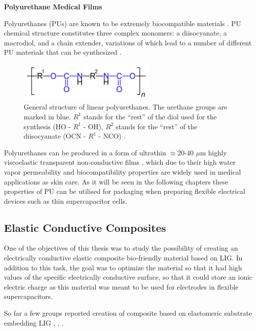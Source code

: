 \textbf{Polyurethane Medical Films}

Polyurethanes (PUs) are known to be extremely biocompatible materials \cite{SASTRI2014121}. PU chemical structure constitutes three complex monomers: a diisocyanate, a macrodiol, and a chain extender, variations of which lead to a number of different PU materials that can be synthesized \cite{KOHLI2019125}.

\begin{figure}[H]
\centering
\includegraphics[width=0.6\textwidth]{Figures/Theory/2880px-Polyurethane-allg.png}
\medskip
\captionsetup{width=0.6\linewidth}
\caption{General structure of linear polyurethanes. The urethane groups are marked in blue. $R^1$ stands for the “rest” of the diol used for the synthesis (HO - $R^1$ - OH), $R^2$ stands for the “rest” of the diisocyanate (OCN - $R^1$ - NCO) \cite{Polyurethanen}.}
\label{fig:PU-structure}
\end{figure}

Polyurethanes can be produced in a form of ultrathin $\approx$20-40 $\mu$m highly viscoelastic transparent non-conductive films \cite{Fixomull}, which due to their high water vapor permeability and biocompatibility properties are widely used in medical applications as skin care. As it will be seen in the following chapters these properties of PU can be utilised for packaging when preparing flexible electrical devices such as thin supercapacitor cells. 


\subsection{Elastic Conductive Composites}

One of the objectives of this thesis was to study the possibility of creating an electrically conductive elastic composite bio-friendly material based on LIG. In addition to this task, the goal was to optimize the material so that it had high values of the specific electrically conductive surface, so that it could store an ionic electric charge as this material was meant to be used for electrodes in flexible supercapacitors.

So far a few groups reported creation of composite based on elastomeric substrate embedding LIG \cite{dallinger_stretchable_2020}, \cite{jeong_flexible_2019}, \cite{parmeggiani_pdmspolyimide_2019}.

